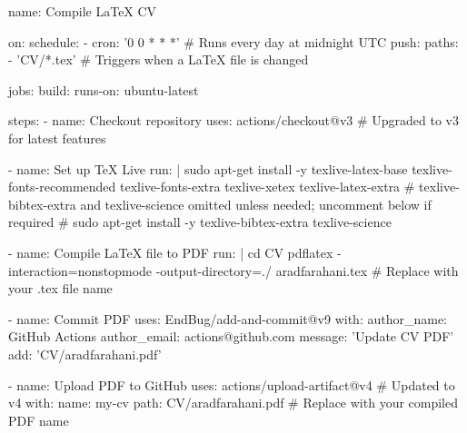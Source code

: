 name: Compile LaTeX CV

on:
  schedule:
    - cron: '0 0 * * *'  # Runs every day at midnight UTC
  push:
    paths:
      - 'CV/*.tex'  # Triggers when a LaTeX file is changed

jobs:
  build:
    runs-on: ubuntu-latest

    steps:
    - name: Checkout repository
      uses: actions/checkout@v3  # Upgraded to v3 for latest features

    - name: Set up TeX Live
      run: |
        sudo apt-get install -y texlive-latex-base texlive-fonts-recommended texlive-fonts-extra texlive-xetex texlive-latex-extra
        # texlive-bibtex-extra and texlive-science omitted unless needed; uncomment below if required
        # sudo apt-get install -y texlive-bibtex-extra texlive-science

    - name: Compile LaTeX file to PDF
      run: |
        cd CV
        pdflatex -interaction=nonstopmode -output-directory=./ aradfarahani.tex  # Replace with your .tex file name

    - name: Commit PDF
      uses: EndBug/add-and-commit@v9
      with:
        author_name: GitHub Actions
        author_email: actions@github.com
        message: 'Update CV PDF'
        add: 'CV/aradfarahani.pdf'

    - name: Upload PDF to GitHub
      uses: actions/upload-artifact@v4  # Updated to v4
      with:
        name: my-cv
        path: CV/aradfarahani.pdf  # Replace with your compiled PDF name
